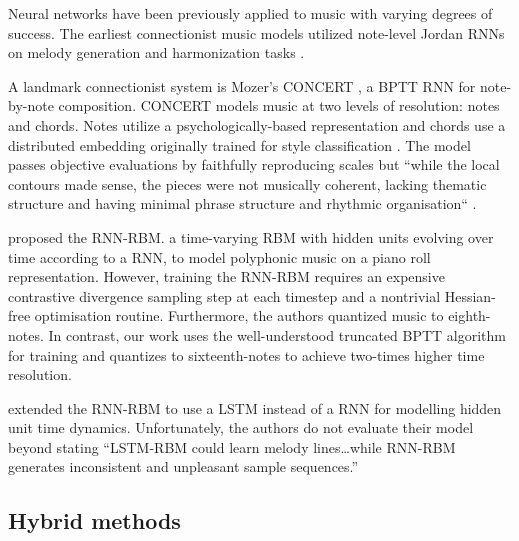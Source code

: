 Neural networks have been previously applied to music with varying degrees of
success\citep{griffith1999musical}. The earliest connectionist music models
utilized note-level Jordan RNNs on melody generation and harmonization tasks
\citep{todd1988sequential} \cite{todd1989connectionist}
\citep{bharucha1989modeling}. 

A landmark connectionist system is Mozer's CONCERT \citep{mozer1994neural}, a
BPTT RNN for note-by-note composition. CONCERT models music at two
levels of resolution: notes and chords. Notes utilize a psychologically-based
representation \citep{shepard1982geometrical} and chords use a distributed
embedding originally trained for style classification
\citep{laden1989representation}. The model passes objective evaluations by
faithfully reproducing scales but ``while the local contours made sense, the
pieces were not musically coherent, lacking thematic structure and having
minimal phrase structure and rhythmic organisation`` \citep{mozer1994neural}.

\citep{Boulanger-Lewandowski2012} proposed the RNN-RBM. a time-varying RBM with
hidden units evolving over time according to a RNN, to model polyphonic music
on a piano roll representation. However, training the RNN-RBM requires an
expensive contrastive divergence sampling step at each timestep and a
nontrivial Hessian-free optimisation routine. Furthermore, the authors
quantized music to eighth-notes. In contrast, our work uses the well-understood
truncated BPTT algorithm for training and quantizes to sixteenth-notes to achieve
two-times higher time resolution.

\citep{Lyu2015} extended the RNN-RBM\cite{Boulanger-Lewandowski2012} to use a
LSTM instead of a RNN for modelling hidden unit time dynamics. Unfortunately,
the authors do not evaluate their model beyond stating ``LSTM-RBM could learn
melody lines\ldots while RNN-RBM generates inconsistent and unpleasant sample
sequences.''

\subsection{Hybrid methods}

